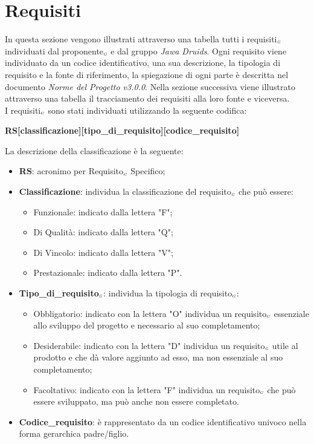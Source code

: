\chapter{Requisiti}\label{Requisiti}
In questa sezione vengono illustrati attraverso una tabella tutti i requisiti$_{\scaleto{G}{3pt}}$ individuati dal proponente$_{\scaleto{G}{3pt}}$ e dal gruppo \textit{Jawa Druids}. Ogni requisito viene individuato da un codice identificativo, una sua descrizione, la tipologia di requisito e la fonte di riferimento, la spiegazione di ogni parte è descritta nel documento \textit{Norme del Progetto v3.0.0}. Nella sezione successiva viene illustrato attraverso una tabella il tracciamento dei requisiti alla loro fonte e viceversa.\\
I requisiti$_{\scaleto{G}{3pt}}$ sono stati individuati utilizzando la seguente codifica:
\begin{center}
	\textbf{RS[classificazione][tipo\_di\_requisito][codice\_requisito]}
\end{center}
La descrizione della classificazione è la seguente:
\begin{itemize}
	\item \textbf{RS}: acronimo per Requisito$_{\scaleto{G}{3pt}}$ Specifico;
	\item \textbf{Classificazione}: individua la classificazione del requisito$_{\scaleto{G}{3pt}}$ che può essere:
	\begin{itemize}
		\item Funzionale: indicato dalla lettera "F";
		\item Di Qualità: indicato dalla lettera "Q";
		\item Di Vincolo: indicato dalla lettera "V";
		\item Prestazionale: indicato dalla lettera "P".
	\end{itemize}
	\item \textbf{Tipo\_di\_requisito$_{\scaleto{G}{3pt}}$}: individua la tipologia di requisito$_{\scaleto{G}{3pt}}$:
	\begin{itemize}
		\item Obbligatorio: indicato con la lettera "O" individua un requisito$_{\scaleto{G}{3pt}}$ essenziale allo sviluppo del progetto e necessario al suo completamento;
		\item Desiderabile: indicato con la lettera "D" individua un requisito$_{\scaleto{G}{3pt}}$ utile al prodotto e che dà valore aggiunto ad esso, ma non essenziale al suo completamento;
		\item Facoltativo: indicato con la lettera "F" individua un requisito$_{\scaleto{G}{3pt}}$ che può essere sviluppato, ma può anche non essere completato.
	\end{itemize}
	\item \textbf{Codice\_requisito}: è rappresentato da un codice identificativo univoco nella forma gerarchica padre/figlio.
\end{itemize}

